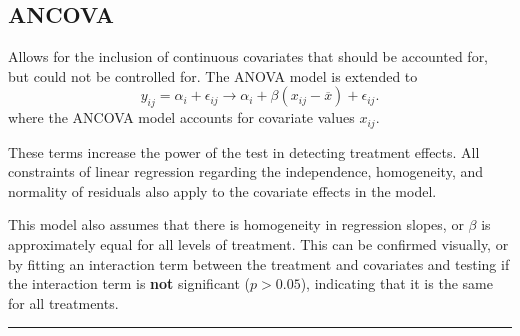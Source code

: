\documentclass{article}
\begin{document}
\begin{multicols}{3}
    \subsection{ANCOVA}
    Allows for the inclusion of continuous covariates that should be accounted for, but could not be controlled for.
    The ANOVA model is extended to
    \begin{equation*}
        y_{ij} = \alpha_i + \epsilon_{ij} \rightarrow \alpha_i + \beta\left( x_{ij} - \overline{x} \right) + \epsilon_{ij}.
    \end{equation*}
    where the ANCOVA model accounts for covariate values \(x_{ij}\).

    These terms increase the power of the test in detecting treatment effects.
    All constraints of linear regression regarding the independence, homogeneity, and normality
    of residuals also apply to the covariate effects in the model.

    This model also assumes that there is homogeneity in regression slopes,
    or \(\beta\) is approximately equal for all levels of treatment.
    This can be confirmed visually, or by fitting an interaction term between the treatment and covariates and testing
    if the interaction term is \textbf{not} significant (\(p > 0.05\)), indicating that it is the same for all treatments.
\end{multicols}
\hrule
\end{document}

